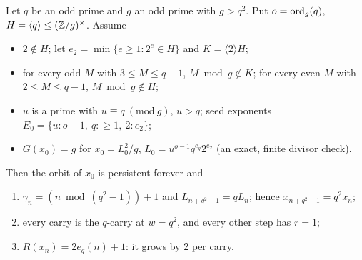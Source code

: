 \begin{theorem}\label{thm:qcarry}
Let \(q\) be an odd prime and \(g\) an odd prime with \(g>q^2\). Put \(o=\operatorname{ord}_g(q)\), \(H=\langle q\rangle\le(\mathbb{Z}/g)^\times\). Assume
\begin{itemize}[nosep]
\item[(Q1)] \(2\notin H\); let \(e_2=\min\{e\ge1:2^e\in H\}\) and \(K=\langle2\rangle H\);
\item[(Q2)] for every odd \(M\) with \(3\le M\le q-1\), \(M\bmod g\notin K\); for every even \(M\) with \(2\le M\le q-1\), \(M\bmod g\notin H\);
\item[(Q3)] \(u\) is a prime with \(u\equiv q\ (\mathrm{mod}\ g)\), \(u>q\); seed exponents \(E_0=\{u:o-1,\ q:\ge1,\ 2:e_2\}\);
\item[(Q4)] \(G(x_0)=g\) for \(x_0=L_0^2/g\), \(L_0=u^{o-1}q^{e_q}2^{e_2}\) (an exact, finite divisor check).
\end{itemize}
Then the orbit of \(x_0\) is persistent forever and
\begin{enumerate}[label=(\roman*),nosep]
\item \(\gamma_n=(n\bmod(q^2-1))+1\) and \(L_{n+q^2-1}=qL_n\); hence \(x_{n+q^2-1}=q^2x_n\);
\item every carry is the \(q\)-carry at \(w=q^2\), and every other step has \(r=1\);
\item \(R(x_n)=2e_q(n)+1\): it grows by 2 per carry.
\end{enumerate}
\end{theorem}
